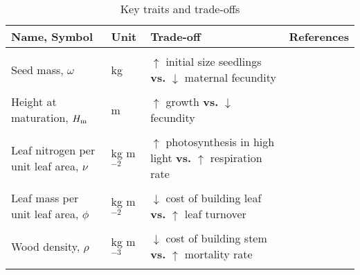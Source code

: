 \documentclass[a4paper,11pt]{article}
\begin{document}
\begin{table}[ht]
 \caption{Key traits and trade-offs}
\centering
{\footnotesize
\raggedright
  \begin{tabular}{p{3cm}p{1.5cm}p{6cm}p{3cm}}
  \\
  \hline
  Name, Symbol & Unit & Trade-off & References \\
  \hline
  \\
  Seed mass, $\omega$ & kg & $\uparrow$ initial size seedlings {\bf vs.} $\downarrow$  maternal fecundity & \citet{Moles-2006}\\
  \\
  Height at maturation, $H_{\rm m}$ & m  & $\uparrow$ growth {\bf vs.} $\downarrow$ fecundity & \citet{Thomas-2011, Wenk-2015}\\
\\
  Leaf nitrogen per unit leaf area, $\nu$ & kg m$^{-2}$ & $\uparrow$ photosynthesis in high light {\bf vs.} $\uparrow$ respiration rate & \citet{Wright-2004}\\
  \\
  Leaf mass per unit leaf area, $\phi$ & kg m$^{-2}$ & $\downarrow$ cost of building leaf {\bf vs.} $\uparrow$ leaf turnover & \citet{Wright-2004}\\
  \\
  Wood density, $\rho$ &  kg m$^{-3}$ & $\downarrow$ cost of building stem {\bf vs.} $\uparrow$ mortality rate & \citet{Chave-2009}\\
  \\
  \hline
  \end{tabular}
}
\label{tab:traits}
\end{table}

\newpage
\end{document}
